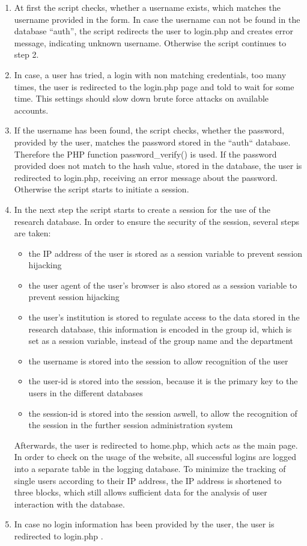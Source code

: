 \begin{enumerate}
 \item At first the script checks, whether a username exists, which matches the username provided in the form. In case the username can not be found in the database ``auth'', the script
 redirects the user to login.php and creates error message, indicating unknown username. Otherwise the script continues to step 2.
 \item In case, a user has tried, a login with non matching credentials, too many times, the user is redirected to the login.php page and told to wait for some time. This settings 
 should slow down brute force attacks on available accounts.
 \item If the username has been found, the script checks, whether the password, provided by the user, matches the password stored in the ``auth`` database. Therefore the PHP function 
 password\_verify() is used. If the password provided does not match to the hash value, stored in the database, the user is redirected to login.php, receiving an error message about the 
 password. Otherwise the script starts to initiate a session.
 \item In the next step the script starts to create a session for the use of the research database. In order to ensure the security of the session, several steps are taken:
 \begin{itemize}
  \item the IP address of the user is stored as a session variable to prevent session hijacking
  \item the user agent of the user's browser is also stored as a session variable to prevent session hijacking
  \item the user's institution is stored to regulate access to the data stored in the research database, this information is encoded in the group id, which is set as a session
  variable, instead of the group name and the department
  \item the username is stored into the session to allow recognition of the user 
  \item the user-id is stored into the session, because it is the primary key to the users in the different databases
  \item the session-id is stored into the session aswell, to allow the recognition of the session in the further session administration system
 \end{itemize}
  Afterwards, the user is redirected to home.php, which acts as the main page. In order to check on the usage of the website, all successful logins are logged into a separate 
  table in the logging database. To minimize the tracking of single users according to their IP address, the IP address is shortened to three blocks, which still allows sufficient 
  data for the analysis of user interaction with the database.
  \item In case no login information has been provided by the user, the user is redirected to login.php .\\
\end{enumerate}
